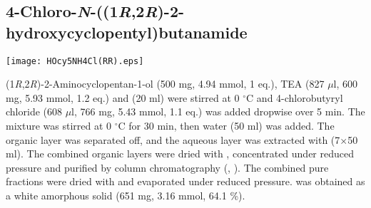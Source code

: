 \subsection{4\hyp{}Chloro\hyp{}\textit{N}\hyp{}((1\textit{R},2\textit{R})\hyp{}2\hyp{}hydroxycyclopentyl)butanamide }


\begin{scheme}[H]
	\begin{center}
		\texttt{[image: HOcy5NH4Cl(RR).eps]}
	\end{center}
\end{scheme}

(1\textit{R},2\textit{R})\hyp{}2\hyp{}Aminocyclopentan\hyp{}1\hyp{}ol  (500 mg, 4.94 mmol, 1 eq.), TEA (827 $\mu$l, 600 mg, 5.93 mmol, 1.2 eq.) and  (20 ml) were stirred at 0 $^\circ$C and 4-chlorobutyryl chloride  (608 $\mu$l, 766 mg, 5.43 mmol, 1.1 eq.) was added dropwise over 5 min. The mixture was stirred at 0 $^\circ$C for 30 min, then water (50 ml) was added. The organic layer was separated off, and the aqueous layer was extracted with  (7$\times$50 ml). The combined organic layers were dried with , concentrated under reduced pressure and purified by column chromatography (, ). The combined pure fractions were dried with  and evaporated under reduced pressure.  was obtained as a white amorphous solid (651 mg, 3.16 mmol, 64.1 \%).
\\[1\baselineskip]
\\[1\baselineskip]
\\[1\baselineskip]
